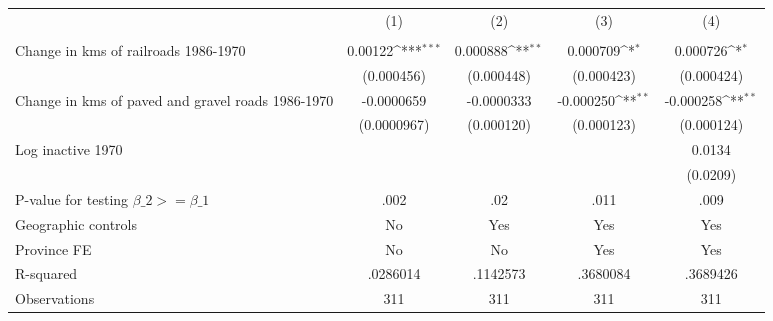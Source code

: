 {
\def\sym#1{\ifmmode^{#1}\else\(^{#1}\)\fi}
\begin{tabular}{l*{4}{c}}
\hline\hline
                &\multicolumn{1}{c}{(1)}&\multicolumn{1}{c}{(2)}&\multicolumn{1}{c}{(3)}&\multicolumn{1}{c}{(4)}\\
                &\multicolumn{1}{c}{}&\multicolumn{1}{c}{}&\multicolumn{1}{c}{}&\multicolumn{1}{c}{}\\
\hline
Change in kms of railroads 1986-1970&  0.00122\sym{***}& 0.000888\sym{**} & 0.000709\sym{*}  & 0.000726\sym{*}  \\
                &(0.000456)         &(0.000448)         &(0.000423)         &(0.000424)         \\
[1em]
Change in kms of paved and gravel roads 1986-1970&-0.0000659         &-0.0000333         &-0.000250\sym{**} &-0.000258\sym{**} \\
                &(0.0000967)         &(0.000120)         &(0.000123)         &(0.000124)         \\
[1em]
Log inactive 1970&                  &                  &                  &   0.0134         \\
                &                  &                  &                  & (0.0209)         \\
\hline
P-value for testing $\beta\_{2} >= \beta\_{1}$&     .002         &      .02         &     .011         &     .009         \\
Geographic controls&       No         &      Yes         &      Yes         &      Yes         \\
Province FE     &       No         &       No         &      Yes         &      Yes         \\
R-squared       & .0286014         & .1142573         & .3680084         & .3689426         \\
Observations    &      311         &      311         &      311         &      311         \\
\hline\hline
\end{tabular}
}
